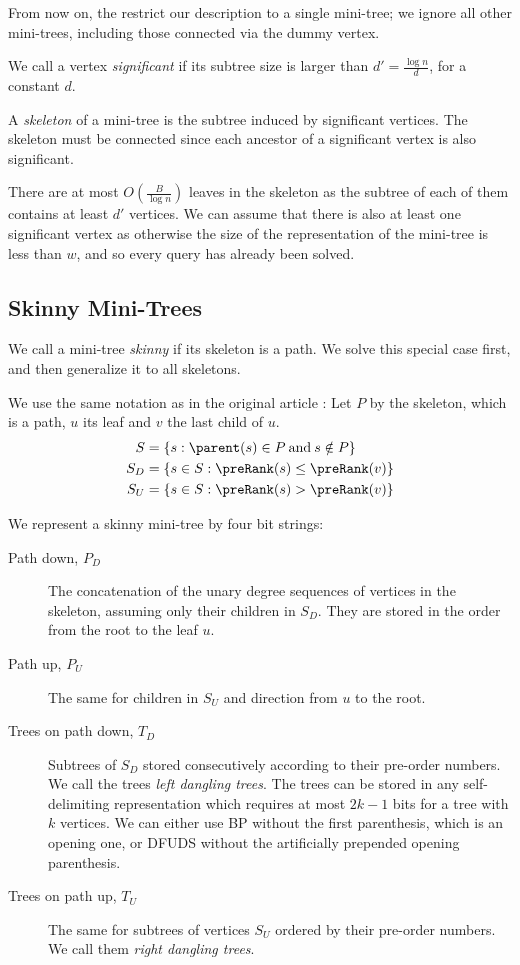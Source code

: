 \bigbreak

From now on, the restrict our description to a single mini-tree; we ignore all other mini-trees, including those connected via the dummy vertex.

We call a vertex \emph{significant} if its subtree size is larger than $d' = \frac{\log n}{d}$, for a constant $d$.

A \emph{skeleton} of a mini-tree is the subtree induced by significant vertices.
The skeleton must be connected since each ancestor of a significant vertex is also significant.

There are at most $O(\frac{B}{\log n})$ leaves in the skeleton as the subtree of each of them contains at least $d'$ vertices.
We can assume that there is also at least one significant vertex as otherwise the size of the representation of the mini-tree is less than $w$, and so every query has already been solved.

\subsection{Skinny Mini-Trees}

We call a mini-tree \emph{skinny} if its skeleton is a path.
We solve this special case first, and then generalize it to all skeletons.

We use the same notation as in the original article \cite{farzan2009universal}:
Let $P$ by the skeleton, which is a path, $u$ its leaf and $v$ the last child of $u$.
\begin{align*}
	S &= \{ s : \parent(s) \in P \booland s \notin P \} \\
	S_D &= \{ s \in S : \preRank(s) \le \preRank(v) \} \\
	S_U &= \{ s \in S : \preRank(s) > \preRank(v) \}
\end{align*}

We represent a skinny mini-tree by four bit strings:
\begin{description}
	\item[Path down, $P_D$]
	The concatenation of the unary degree sequences of vertices in the skeleton, assuming only their children in $S_D$.
	They are stored in the order from the root to the leaf $u$.
	
	\item[Path up, $P_U$]
	The same for children in $S_U$ and direction from $u$ to the root.
	
	\item[Trees on path down, $T_D$]
	Subtrees of $S_D$ stored consecutively according to their pre-order numbers.
	We call the trees \emph{left dangling trees}.
	The trees can be stored in any self-delimiting representation which requires at most $2k - 1$ bits for a tree with $k$ vertices.
	We can either use BP without the first parenthesis, which is an opening one, or DFUDS without the artificially prepended opening parenthesis.
	
	\item[Trees on path up, $T_U$]
	The same for subtrees of vertices $S_U$ ordered by their pre-order numbers.
	We call them \emph{right dangling trees}.
\end{description}

